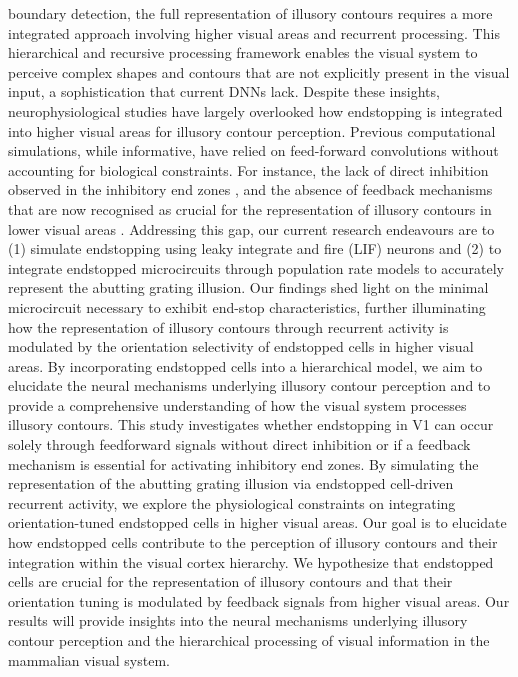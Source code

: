 \documentclass[12pt]{article}
\begin{document}
boundary detection, the full representation of illusory contours requires a more integrated approach involving higher visual areas and recurrent processing. This hierarchical and recursive processing framework enables the visual system to perceive complex shapes and contours that are not explicitly present in the visual input, a sophistication that current DNNs lack.
\bigbreak
Despite these insights, neurophysiological studies have largely overlooked how endstopping is integrated into higher visual areas for illusory contour perception. Previous computational simulations, while informative, have relied on feed-forward convolutions without accounting for biological constraints. For instance, the lack of direct inhibition observed in the inhibitory end zones \autocite{sillitoContributionExcitatoryInhibitory1977}, and the absence of feedback mechanisms that are now recognised as crucial for the representation of illusory contours in lower visual areas \autocite{pakTopDownFeedbackControls2020}. Addressing this gap, our current research endeavours are to (1) simulate endstopping using leaky integrate and fire (LIF) neurons and (2) to integrate endstopped microcircuits through population rate models to accurately represent the abutting grating illusion. Our findings shed light on the minimal microcircuit necessary to exhibit end-stop characteristics, further illuminating how the representation of illusory contours through recurrent activity is modulated by the orientation selectivity of endstopped cells in higher visual areas. By incorporating endstopped cells into a hierarchical model, we aim to elucidate the neural mechanisms underlying illusory contour perception and to provide a comprehensive understanding of how the visual system processes illusory contours. This study investigates whether endstopping in V1 can occur solely through feedforward signals without direct inhibition or if a feedback mechanism is essential for activating inhibitory end zones. By simulating the representation of the abutting grating illusion via endstopped cell-driven recurrent activity, we explore the physiological constraints on integrating orientation-tuned endstopped cells in higher visual areas. Our goal is to elucidate how endstopped cells contribute to the perception of illusory contours and their integration within the visual cortex hierarchy. We hypothesize that endstopped cells are crucial for the representation of illusory contours and that their orientation tuning is modulated by feedback signals from higher visual areas. Our results will provide insights into the neural mechanisms underlying illusory contour perception and the hierarchical processing of visual information in the mammalian visual system.
\end{document}
